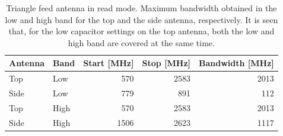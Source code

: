 \begin{table}[htbp]
    \centering
    \begin{tabular}{|l|l|r|r|r|}
        \hline
        Antenna & Band & Start [MHz] & Stop [MHz] & Bandwidth [MHz] \\
        \hline
        Top     & Low  & 570         & 2583       & 2013 \\
        Side    & Low  & 779         & 891        & 112  \\
        \hline
        Top     & High & 570         & 2583       & 2013 \\
        Side    & High & 1506        & 2623       & 1117 \\
        \hline
    \end{tabular}
    \caption{Triangle feed antenna in read mode. Maximum bandwidth obtained in the low and high band for the top and the side antenna, respectively. It is seen that, for the low capacitor settings on the top antenna, both the low and high band are covered at the same time.}
    \label{tab:bw_sol2read}
\end{table}

